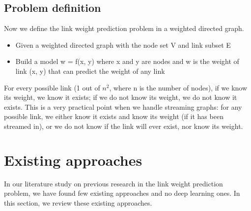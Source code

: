 \documentclass[conference]{IEEEtran}
\begin{document}
\subsection{Problem definition}
Now we define the link weight prediction problem in a weighted directed graph.
\begin{itemize}
	\item Given a weighted directed graph with the node set V and link subset E
	\item Build a model w = f(x, y) where x and y are nodes and w is the weight of link (x, y) that can predict the weight of any link
\end{itemize}
For every possible link (1 out of $ n^2 $, where n is the number of nodes), 
if we know its weight, we know it exists;
if we do not know its weight, we do not know it exists.
This is a very practical point when we handle streaming graphs:
for any possible link,
we either know it exists and know its weight (if it has been streamed in), or we do not know if the link will ever exist, nor know its weight.

\section{Existing approaches}
In our literature study on previous research in the link weight prediction problem,
we have found few existing approaches and no deep learning ones.
In this section,
we review these existing approaches.
\end{document}
